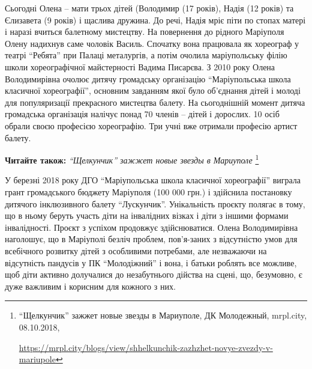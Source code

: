 Сьогодні Олена – мати трьох дітей (Володимир (17 років), Надія (12 років) та
Єлизавета (9 років) і щаслива дружина. До речі, Надія мріє піти по стопах
матері і наразі вчиться балетному мистецтву. На повернення до рідного Маріуполя
Олену надихнув саме чоловік Василь. Спочатку вона працювала як хореограф у
театрі \enquote{Ребята} при Палаці металургів, а потім очолила маріупольську філію
школи хореографічної майстерності Вадима Писарєва. З 2010 року Олена
Володимирівна очолює дитячу громадську організацію \enquote{Маріупольська школа
класичної хореографії}, основним завданням якої було об’єднання дітей і молоді
для популяризації прекрасного мистецтва балету. На сьогоднішній момент дитяча
громадська організація налічує понад 70 членів – дітей і дорослих. 10 осіб
обрали своєю професією хореографію. Три учні вже отримали професію артист
балету.

\textbf{Читайте також:} \emph{\enquote{Щелкунчик} зажжет новые звезды в Мариуполе}%
\footnote{\enquote{Щелкунчик} зажжет новые звезды в Мариуполе, ДК Молодежный, mrpl.city, 08.10.2018, \par%
\url{https://mrpl.city/blogs/view/shhelkunchik-zazhzhet-novye-zvezdy-v-mariupole}
}


У березні 2018 року ДГО \enquote{Маріупольська школа класичної хореографії} виграла
грант громадського бюджету Маріуполя (100 000 грн.) і здійснила постановку
дитячого інклюзивного балету \enquote{Лускунчик}. Унікальність проєкту полягає в тому,
що в ньому беруть участь діти на інвалідних візках і діти з іншими формами
інвалідності. Проєкт з успіхом продовжує здійснюватися. Олена Володимирівна
наголошує, що в Маріуполі безліч проблем, пов'я\hyp{}заних з відсутністю умов для
всебічного розвитку дітей з особливими потребами, але незважаючи на відсутність
пандусів у ПК \enquote{Молодіжний} і вона, і батьки роблять все можливе, щоб діти
активно долучалися до незабутнього дійства на сцені, що, безумовно, є дуже
важливим і корисним для кожного з них.


